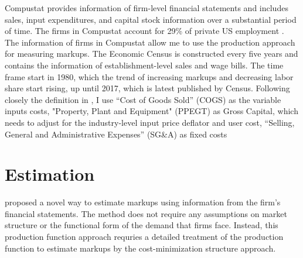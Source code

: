 \documentclass[12pt]{article}
\begin{document}
Compustat provides information of firm-level financial statements and includes sales, input expenditures, and capital stock information over a substantial period of time. The firms in Compustat account for 29\% of private US employment \citep{davis2006volatility}. The information of firms in Compustat allow me to use the production approach for measuring markups. The Economic Census is constructed every five years and contains the information of establishment-level sales and wage bills. The time frame start in 1980, which the trend of increasing markups and decreasing labor share start rising, up until 2017, which is latest published by Census. Following closely the definition in \citet{de2017rise}, I use “Cost of Goods Sold” (COGS) as the variable inputs costs, "Property, Plant and Equipment" (PPEGT) as Gross Capital, which needs to adjust for the industry-level input price deflator and user cost, “Selling, General and Administrative Expenses” (SG&A) as fixed costs 

\section{Estimation}
\citet{de2012markups} proposed a novel way to estimate markups using information from the firm’s financial statements. The method does not require any assumptions on market structure or the functional form of the demand that firms face. Instead, this production function approach requries a detailed treatment of the production function to estimate markups by the cost-minimization structure approach.
\end{document}
